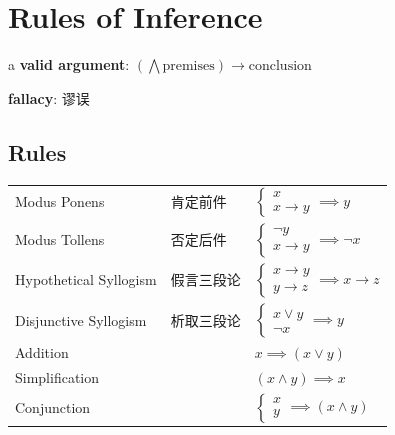 \documentclass[12pt, a4paper, UTF8, openany]{ctexbook}
\newcommand{\bigand}{\bigwedge}
\begin{document}
    \section{Rules of Inference}
    a \textbf{valid argument}: $(\bigand\text{premises}) \to \text{conclusion}$

    \textbf{fallacy}: 谬误

        \subsection{Rules}
        \begin{longtable}[h]{l | l | l}
            Modus Ponens & 肯定前件 & 
            $\begin{cases}
                x \\ x \to y    
            \end{cases} \implies y$ \\
            \addlinespace

            Modus Tollens & 否定后件 & 
            $\begin{cases}
                \lnot y \\ x \to y
            \end{cases} \implies \lnot x$ \\
            \midrule

            Hypothetical Syllogism & 假言三段论 & 
            $\begin{cases}
                x \to y \\ y \to z
            \end{cases} \implies x \to z$ \\
            \addlinespace

            Disjunctive Syllogism & 析取三段论 & 
            $\begin{cases}
                x \lor y \\ \lnot x
            \end{cases} \implies y$ \\
            \midrule

            Addition & & $x \implies (x \lor y)$ \\
            \addlinespace

            Simplification & & $(x \land y) \implies x$ \\
            \addlinespace

            Conjunction & & 
            $\begin{cases}
            x \\ y    
            \end{cases} \implies (x \land y)$ \\
            \midrule


\end{longtable}
\end{document}
